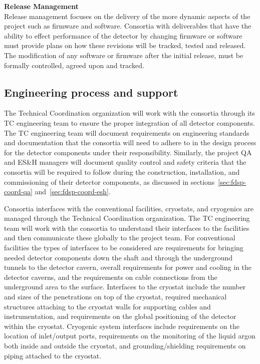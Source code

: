 {\bf Release Management}\\
Release management focuses on the delivery of the more dynamic aspects
of the project such as firmware and software.  Consortia with
deliverables that have the ability to effect performance of the
detector by changing firmware or software must provide plans on how
these revisions will be tracked, tested and released.  The
modification of any software or firmware after the initial release,
must be formally controlled, agreed upon and tracked.


\subsection{Engineering process and support}
\label{sec:fdsp-coord-integ-engr-proc}
 

The  Technical Coordination organization will work with
the consortia through its TC engineering team to ensure the proper
integration of all detector components.  The TC engineering team will
document requirements on engineering standards and documentation that
the consortia will need to adhere to in the design process for the
detector components under their responsibility.  Similarly, the
project QA and ES\&H managers will document quality control and safety
criteria that the consortia will be required to follow during the
construction, installation, and commissioning of their detector
components, as discussed in sections~\ref{sec:fdsp-coord-qa}
and~\ref{sec:fdsp-coord-esh}.


Consortia interfaces with the conventional facilities, cryostats, and
cryogenics are managed through the  Technical Coordination
organization.  The TC engineering team will work with the
consortia to understand their interfaces to the facilities and then
communicate these globally to the  project team.  For conventional
facilities the types of interfaces to be considered are requirements
for bringing needed detector components down the shaft and through the
underground tunnels to the detector cavern, overall requirements for
power and cooling in the detector caverns, and the requirements on
cable connections from the underground area to the surface.
Interfaces to the cryostat include the number and sizes of the
penetrations on top of the cryostat, required mechanical structures
attaching to the cryostat walls for supporting cables and
instrumentation, and requirements on the global positioning of the
detector within the cryostat.  Cryogenic system interfaces include
requirements on the location of inlet/output ports, requirements on
the monitoring of the liquid argon both inside and outside the
cryostat, and grounding/shielding requirements on piping attached to
the cryostat.

